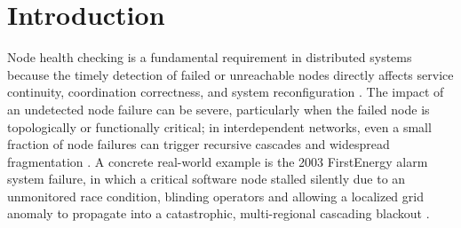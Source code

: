 
\section{Introduction}
\label{sec:introduction}




Node health checking is a fundamental requirement in distributed systems because the timely detection of failed or
unreachable nodes directly affects service continuity, coordination correctness, and system reconfiguration
\cite{liEnergyefficientLazyGroup2025} \cite{yangMedleyMembershipService2022}. The impact of an undetected node failure
can be severe, particularly when the failed node is topologically or functionally critical; in interdependent networks,
even a small fraction of node failures can trigger recursive cascades and widespread fragmentation
\cite{buldyrevCatastrophicCascadeFailures2010}. A concrete real-world example is the 2003 FirstEnergy alarm system
failure, in which a critical software node stalled silently due to an unmonitored race condition, blinding operators
and allowing a localized grid anomaly to propagate into a catastrophic, multi-regional cascading blackout
\cite{Blackout20032003}.

